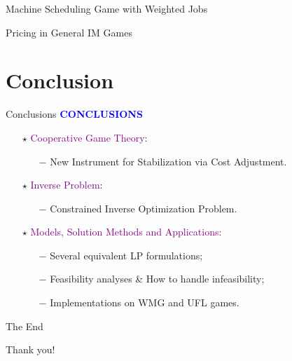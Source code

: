 \documentclass[14pt]{beamer}
\begin{document}
\begin{frame}{Machine Scheduling Game with Weighted Jobs}

\end{frame}

\begin{frame}{Pricing in General IM Games}

\end{frame}

\section{Conclusion}
\begin{frame}{Conclusions}
\centering
\large
\vspace{1mm}
\textcolor{blue}{\bf {\huge C}ONCLUSIONS}
\vspace{2mm}
\begin{itemize}
\normalsize
\justifying
\item[$\star$] \textcolor{purple}{Cooperative Game Theory}:
\begin{itemize}
\small
\vspace{2mm}
\item[$-$] {New Instrument for Stabilization via Cost Adjustment}.
\vspace{2mm}
\end{itemize}
\item[$\star$] \textcolor{purple}{Inverse Problem}:
\begin{itemize}
\small
\vspace{2mm}
\item[$-$] Constrained Inverse Optimization Problem.
\vspace{2mm}
\end{itemize}
\item[$\star$] \textcolor{purple}{Models, Solution Methods and Applications}:
\begin{itemize}
\small
\vspace{2mm}
\item[$-$] Several equivalent LP formulations;
\vspace{2mm}
\item[$-$] Feasibility analyses \& How to handle infeasibility;
\vspace{2mm}
\item[$-$] Implementations on WMG and UFL games.
\end{itemize}
\end{itemize}
\end{frame}

\begin{frame}{The End}
\begin{center}
	\begin{LARGE}
		Thank you!
	\end{LARGE}
\end{center}
\end{frame}
\end{document}
